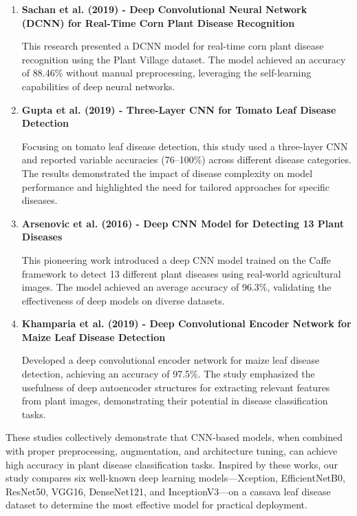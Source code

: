 \begin{enumerate}[label=\arabic*.]
  \item \textbf{Sachan et al. (2019) - Deep Convolutional Neural Network (DCNN) for Real-Time Corn Plant Disease Recognition}

  This research presented a DCNN model for real-time corn plant disease recognition using the Plant Village dataset. The model achieved an accuracy of 88.46\% without manual preprocessing, leveraging the self-learning capabilities of deep neural networks.

  \item \textbf{Gupta et al. (2019) - Three-Layer CNN for Tomato Leaf Disease Detection}

  Focusing on tomato leaf disease detection, this study used a three-layer CNN and reported variable accuracies (76--100\%) across different disease categories. The results demonstrated the impact of disease complexity on model performance and highlighted the need for tailored approaches for specific diseases.

  \item \textbf{Arsenovic et al. (2016) - Deep CNN Model for Detecting 13 Plant Diseases}

  This pioneering work introduced a deep CNN model trained on the Caffe framework to detect 13 different plant diseases using real-world agricultural images. The model achieved an average accuracy of 96.3\%, validating the effectiveness of deep models on diverse datasets.

  \item \textbf{Khamparia et al. (2019) - Deep Convolutional Encoder Network for Maize Leaf Disease Detection}

  Developed a deep convolutional encoder network for maize leaf disease detection, achieving an accuracy of 97.5\%. The study emphasized the usefulness of deep autoencoder structures for extracting relevant features from plant images, demonstrating their potential in disease classification tasks.
\end{enumerate}

These studies collectively demonstrate that CNN-based models, when combined with proper preprocessing, augmentation, and architecture tuning, can achieve high accuracy in plant disease classification tasks. Inspired by these works, our study compares six well-known deep learning models---Xception, EfficientNetB0, ResNet50, VGG16, DenseNet121, and InceptionV3---on a cassava leaf disease dataset to determine the most effective model for practical deployment.